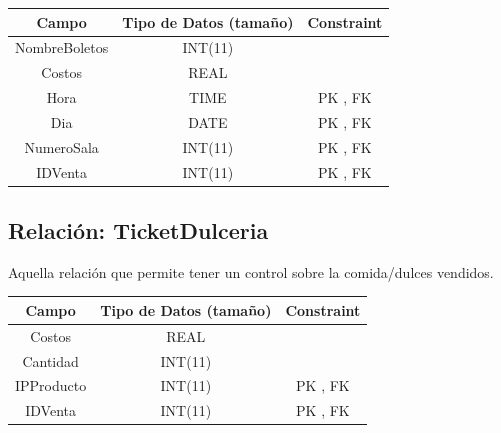\documentclass[12pt, fleqn]{report}                             %
\begin{document}
            \small{
            \begin{tabular}{| c | c | c |}
                \hline
                \textbf{Campo} & \textbf{Tipo de Datos (tamaño)} & \textbf{Constraint} \\[0.5ex] 
                \hline\hline
                
                NombreBoletos   & INT(11)    &                           \\
                Costos          & REAL       &                           \\
                Hora            & TIME       & PK , FK                   \\
                Dia             & DATE       & PK , FK                   \\
                NumeroSala      & INT(11)    & PK , FK                   \\
                IDVenta         & INT(11)    & PK , FK                   \\
                \hline
            \end{tabular}
            }


        \subsection*{Relación: TicketDulceria}

            Aquella relación que permite tener un control sobre la comida/dulces vendidos.

            \vspace{2em}

            \small{
            \begin{tabular}{| c | c | c |}
                \hline
                \textbf{Campo} & \textbf{Tipo de Datos (tamaño)} & \textbf{Constraint} \\[0.5ex] 
                \hline\hline
                
                Costos          & REAL       &                           \\
                Cantidad        & INT(11)    &                           \\
                IPProducto      & INT(11)    & PK , FK                   \\
                IDVenta         & INT(11)    & PK , FK                   \\
                \hline
            \end{tabular}
            }
\end{document}
